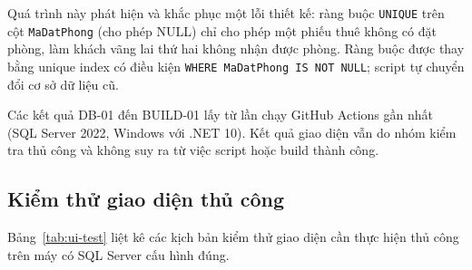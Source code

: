 \documentclass[14pt]{report}
\begin{document}
Quá trình này phát hiện và khắc phục một lỗi thiết kế: ràng buộc \texttt{UNIQUE} trên cột \texttt{MaDatPhong} (cho phép NULL) chỉ cho phép một phiếu thuê không có đặt phòng, làm khách vãng lai thứ hai không nhận được phòng. Ràng buộc được thay bằng unique index có điều kiện \texttt{WHERE MaDatPhong IS NOT NULL}; script tự chuyển đổi cơ sở dữ liệu cũ.

Các kết quả DB-01 đến BUILD-01 lấy từ lần chạy GitHub Actions gần nhất (SQL Server 2022, Windows với .NET 10). Kết quả giao diện vẫn do nhóm kiểm tra thủ công và không suy ra từ việc script hoặc build thành công.

\subsection{Kiểm thử giao diện thủ công}

Bảng~\ref{tab:ui-test} liệt kê các kịch bản kiểm thử giao diện cần thực hiện thủ công trên máy có SQL Server cấu hình đúng.
\end{document}
